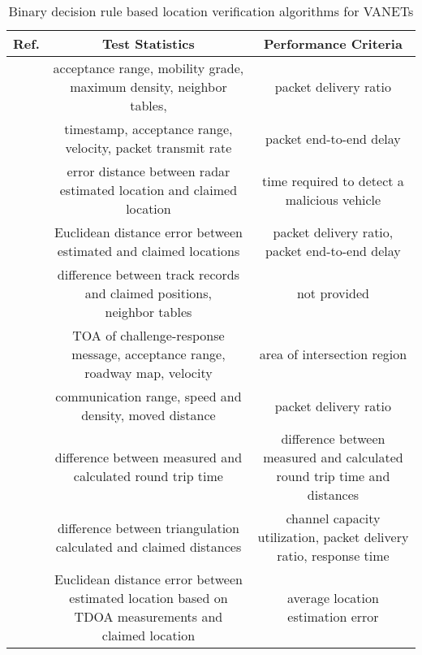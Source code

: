 \documentclass[journal]{IEEEtran}
\begin{document}
\begin{table}
\caption{Binary decision rule based location verification algorithms for VANETs}
\begin{center}
\begin{tabular}{c | c | c }
\hline
Ref. & Test Statistics & Performance Criteria \\
\hline
\cite{leinmuller2006position} & \parbox[c]{3.5cm}{acceptance range, mobility grade, maximum density, neighbor tables, } & \parbox[c]{3.5cm}{packet delivery ratio} \\
\hline
\cite{harsch2007secure} & \parbox[c]{3.5cm}{timestamp, acceptance range, velocity, packet transmit rate} & \parbox[c]{3.5cm}{packet end-to-end delay}\\
\hline
\cite{yan2008providing} & \parbox[c]{3.5cm}{error distance between radar estimated location and claimed location} & \parbox[c]{3.5cm}{time required to detect a malicious vehicle}\\
\hline
\cite{song2008secure} & \parbox[c]{3.5cm}{Euclidean distance error between estimated and claimed locations} & \parbox[c]{3.5cm}{packet delivery ratio, packet end-to-end delay}\\
\hline
\cite{yan2009providing} & \parbox[c]{3.5cm}{difference between track records and claimed positions, \\neighbor tables} & not provided\\
\hline
\cite{xue2010trusted} & \parbox[c]{3.5cm}{TOA of challenge-response message, acceptance range, roadway map, velocity} & area of intersection region\\
\hline
\cite{alsharif2011mitigating} & \parbox[c]{3.5cm}{communication range, speed and density, moved distance} & {packet delivery ratio}\\
\hline
\cite{weer2011verifying} & \parbox[c]{3.5cm}{difference between measured and calculated round trip time} & \parbox[c]{3.5cm}{difference between measured and calculated round trip time and distances}\\
\hline
\cite{abumansoor2012secure} & \parbox[c]{3.5cm}{difference between triangulation calculated and claimed distances} & \parbox[c]{3.5cm}{channel capacity utilization, packet delivery ratio, response time}\\
\hline
\cite{das2013position} & \parbox[c]{3.5cm}{Euclidean distance error between estimated location based on TDOA measurements and claimed location} & \parbox[c]{3.5cm}{average location estimation error}\\
\hline
\end{tabular}
\end{center}
\label{table_decision}
\end{table}
\end{document}
